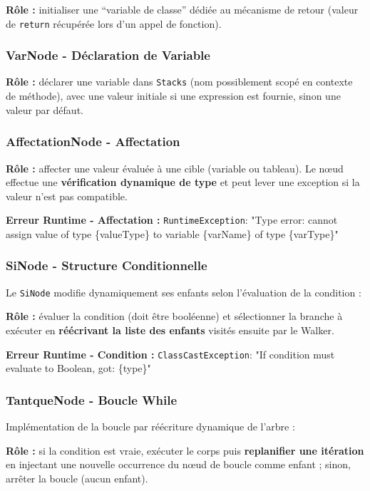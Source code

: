 \noindent\textbf{Rôle :} initialiser une ``variable de classe'' dédiée au mécanisme de retour (valeur de \texttt{return} récupérée lors d'un appel de fonction).

\subsubsection{VarNode - Déclaration de Variable}

\noindent\textbf{Rôle :} déclarer une variable dans \texttt{Stacks} (nom possiblement scopé en contexte de méthode), avec une valeur initiale si une expression est fournie, sinon une valeur par défaut.

\subsubsection{AffectationNode - Affectation}

\noindent\textbf{Rôle :} affecter une valeur évaluée à une cible (variable ou tableau). Le nœud effectue une \textbf{vérification dynamique de type} et peut lever une exception si la valeur n'est pas compatible.

\noindent\textbf{Erreur Runtime - Affectation :} \texttt{RuntimeException}: "Type error: cannot assign value of type \{valueType\} to variable \{varName\} of type \{varType\}"

\subsubsection{SiNode - Structure Conditionnelle}

Le \texttt{SiNode} modifie dynamiquement ses enfants selon l'évaluation de la condition :

\noindent\textbf{Rôle :} évaluer la condition (doit être booléenne) et sélectionner la branche à exécuter en \textbf{réécrivant la liste des enfants} visités ensuite par le Walker.

\noindent\textbf{Erreur Runtime - Condition :} \texttt{ClassCastException}: "If condition must evaluate to Boolean, got: \{type\}"

\subsubsection{TantqueNode - Boucle While}

Implémentation de la boucle par réécriture dynamique de l'arbre :

\noindent\textbf{Rôle :} si la condition est vraie, exécuter le corps puis \textbf{replanifier une itération} en injectant une nouvelle occurrence du nœud de boucle comme enfant ; sinon, arrêter la boucle (aucun enfant).

